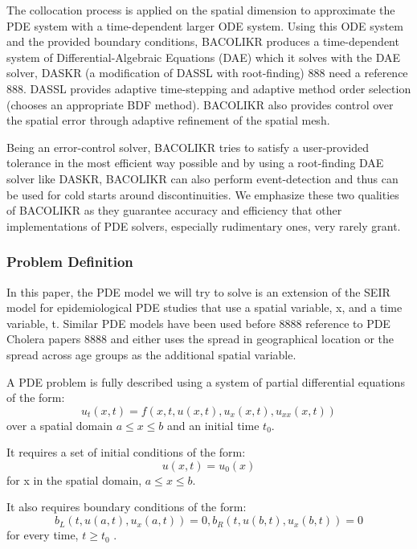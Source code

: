 \documentclass{article}
\begin{document}
The collocation process is applied on the spatial dimension to approximate the PDE system with a time-dependent larger ODE system. Using this ODE system and the provided boundary conditions, BACOLIKR produces a time-dependent system of Differential-Algebraic Equations (DAE) which it solves with the DAE solver, DASKR (a modification of DASSL with root-finding) 888 need a reference 888. DASSL provides adaptive time-stepping and adaptive method order selection (chooses an appropriate BDF method). BACOLIKR also provides control over the spatial error through adaptive refinement of the spatial mesh. 

Being an error-control solver, BACOLIKR tries to satisfy a user-provided tolerance in the most efficient way possible and by using a root-finding DAE solver like DASKR, BACOLIKR can also perform event-detection and thus can be used for cold starts around discontinuities. We emphasize these two qualities of BACOLIKR as they guarantee accuracy and efficiency that other implementations of PDE solvers, especially rudimentary ones, very rarely grant.

\subsubsection{Problem Definition}
\label{subsection:pde_problem_def}
In this paper, the PDE model we will try to solve is an extension of the SEIR model for epidemiological PDE studies that use a spatial variable, x, and a time variable, t. Similar PDE models have been used before 8888 reference to PDE Cholera papers 8888 and either uses the spread in geographical location or the spread across age groups as the additional spatial variable.

A PDE problem is fully described using a system of partial differential equations of the form:
\begin{equation}
u_t(x, t) = f(x, t, u(x,t), u_x(x,t), u_{xx}(x,t))
\end{equation} 
over a spatial domain ${a \leq x \leq b}$ and an initial time ${t_0}$. 

It requires a set of initial conditions of the form:
\begin{equation}
u(x, t) = u_0(x)
\end{equation}
for x in the spatial domain, ${a \leq x \leq b}$.

It also requires boundary conditions of the form:
\begin{equation}
b_L(t, u(a,t), u_x(a,t)) = 0, b_R(t, u(b,t), u_x(b,t)) = 0 
\end{equation} 
for every time, $t \geq t_0$ .
\end{document}
